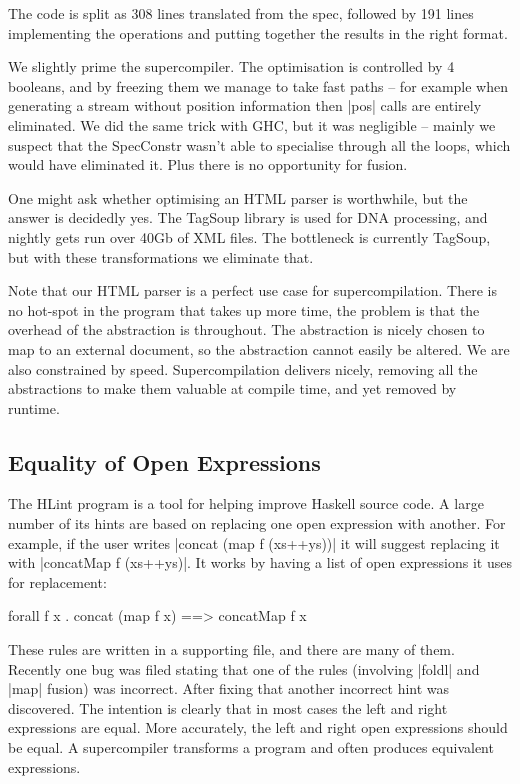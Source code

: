 \documentclass[draft]{sigplanconf}
\begin{document}
The code is split as 308 lines translated from the spec, followed by 191 lines implementing the operations and putting together the results in the right format.

We slightly prime the supercompiler. The optimisation is controlled by 4 booleans, and by freezing them we manage to take fast paths -- for example when generating a stream without position information then |pos| calls are entirely eliminated. We did the same trick with GHC, but it was negligible -- mainly we suspect that the SpecConstr wasn't able to specialise through all the loops, which would have eliminated it. Plus there is no opportunity for fusion.

One might ask whether optimising an HTML parser is worthwhile, but the answer is decidedly yes. The TagSoup library is used for DNA processing, and nightly gets run over 40Gb of XML files. The bottleneck is currently TagSoup, but with these transformations we eliminate that.

Note that our HTML parser is a perfect use case for supercompilation. There is no hot-spot in the program that takes up more time, the problem is that the overhead of the abstraction is throughout. The abstraction is nicely chosen to map to an external document, so the abstraction cannot easily be altered. We are also constrained by speed. Supercompilation delivers nicely, removing all the abstractions to make them valuable at compile time, and yet removed by runtime.

\subsection{Equality of Open Expressions}
\label{sec:hlint}

The HLint program \cite{hlint} is a tool for helping improve Haskell source code. A large number of its hints are based on replacing one open expression with another. For example, if the user writes |concat (map f (xs++ys))| it will suggest replacing it with |concatMap f (xs++ys)|. It works by having a list of open expressions it uses for replacement:

\begin{code}
forall f x . concat (map f x) ==> concatMap f x
\end{code}

These rules are written in a supporting file, and there are many of them. Recently one bug was filed stating that one of the rules (involving |foldl| and |map| fusion) was incorrect. After fixing that another incorrect hint was discovered. The intention is clearly that in most cases the left and right expressions are equal. More accurately, the left and right open expressions should be equal. A supercompiler transforms a program and often produces equivalent expressions.
\end{document}

